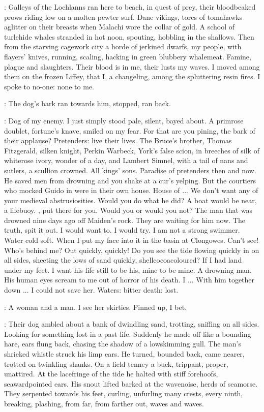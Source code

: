 \StephenInt:
Galleys of the Lochlanns ran here to beach,
in quest of prey,
their bloodbeaked prows riding low on a molten pewter surf.
Dane vikings,
torcs of tomahawks aglitter on their breasts
when Malachi wore the collar of gold.
A school of turlehide whales stranded in hot noon, spouting,
hobbling in the shallows.
Then from the starving cagework city
a horde of jerkined dwarfs,
my people, with flayers' knives,
running, scaling, hacking in green blubbery whalemeat.
Famine, plague and slaughters.
Their blood is in me, their lusts my waves.
I moved among them on the frozen Liffey,
that I, a changeling, among the spluttering resin fires.
I spoke to no-one:
none to me.

:
The dog's bark ran towards him, stopped, ran back.

\StephenInt:
Dog of my enemy.
I just simply stood pale, silent, bayed about.
A primrose doublet, fortune's knave, smiled on my fear.
For that are you pining,
the bark of their applause?
Pretenders:
live their lives.
The Bruce's brother,
Thomas Fitzgerald, silken knight,
Perkin Warbeck, York's false scion,
in breeches of silk of whiterose ivory,
wonder of a day,
and Lambert Simnel, with a tail of nans and sutlers, a scullion crowned.
All kings' sons.
Paradise of pretenders then and now.
He saved men from drowning
and you shake at a cur's yelping.
But the courtiers who mocked Guido in 
were in their own house.
House of ...
We don't want any of your medieval abstrusiosities.
Would you do what he did?
A boat would be near, a lifebuoy.
, put there for you.
Would you or would you not?
The man that was drowned nine days ago off Maiden's rock.
They are waiting for him now.
The truth, spit it out.
I would want to.
I would try.
I am not a strong swimmer.
Water cold soft.
When I put my face into it in the basin at Clongowes.
Can't see!
Who's behind me?
Out quickly, quickly!
Do you see the tide flowing quickly in on all sides,
sheeting the lows of sand quickly, shellcocoacoloured?
If I had land under my feet.
I want his life still to be his, mine to be mine.
A drowning man.
His human eyes scream to me out of horror of his death.
I ...
With him together down ...
I could not save her.
Waters:
bitter death:
lost.

\StephenInt:
A woman and a man.
I see her skirties.
Pinned up, I bet.

:
Their dog ambled about a bank of dwindling sand,
trotting, sniffing on all sides.
Looking for something lost in a past life.
Suddenly he made off like a bounding hare,
ears flung back, chasing the shadow of a lowskimming gull.
The man's shrieked whistle struck his limp ears.
He turned, bounded back, came nearer, trotted on twinkling shanks.
On a field tenney
a buck, trippant, proper, unattired.
At the lacefringe of the tide
he halted with stiff forehoofs, seawardpointed ears.
His snout lifted
barked at the wavenoise, herds of seamorse.
They serpented towards his feet,
curling, unfurling many crests,
every ninth,
breaking, plashing,
from far,
from farther out,
waves and waves.

